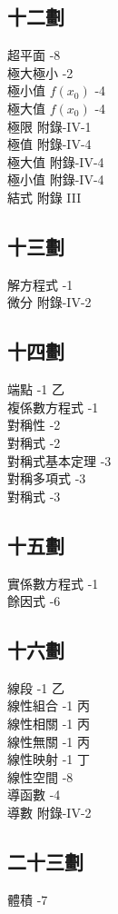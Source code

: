 \begin{multicols}{2}
\subsection*{十二\quad 劃}
\noindent
超平面 -8\\
極大極小 -2\\
極小值 $f(x_0)$ -4\\
極大值 $f(x_0)$ -4\\
極限 \dotfill 附錄-IV-1\\
極值 \dotfill 附錄-IV-4\\
極大值 \dotfill 附錄-IV-4\\
極小值 \dotfill 附錄-IV-4\\
結式 \dotfill 附錄 III

\subsection*{十三\quad 劃}
\noindent
解方程式 -1\\
微分 \dotfill 附錄-IV-2

\subsection*{十四\quad 劃}
\noindent
端點 -1 乙\\
複係數方程式 -1\\
對稱性 -2\\
對稱式 -2\\
對稱式基本定理 -3\\
對稱多項式 -3\\
對稱式 -3

\subsection*{十五\quad 劃}
\noindent
實係數方程式 -1\\
餘因式 -6

\subsection*{十六\quad 劃}
\noindent
線段 -1 乙\\
線性組合 -1 丙\\
線性相關 -1 丙\\
線性無關 -1 丙\\
線性映射 -1 丁\\
線性空間 -8\\
導函數 -4\\
導數 \dotfill 附錄-IV-2

\subsection*{二十三\quad 劃}
\noindent
體積 -7

\end{multicols}
